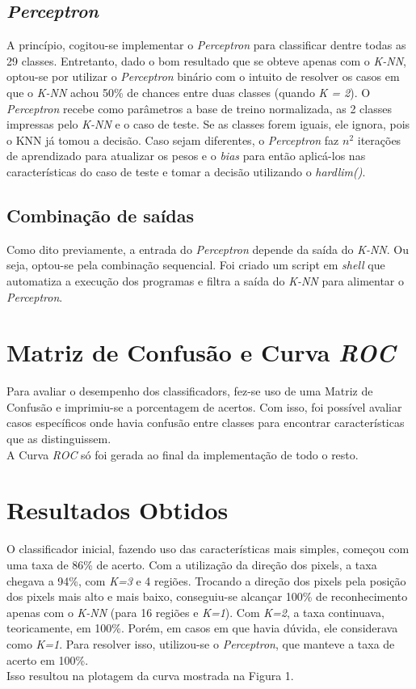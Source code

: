 \documentclass[a4paper,12pt]{article}
\begin{document}
\subsection{\textit{Perceptron}}
A princípio, cogitou-se implementar o \textit{Perceptron} para classificar dentre todas 
as 29 classes. Entretanto, dado o bom resultado que se obteve apenas com o \textit{K-NN},
 optou-se por utilizar o \textit{Perceptron} binário com o intuito de resolver os casos em 
que o \textit{K-NN} achou 50\% de chances entre duas classes (quando \textit{K = 2}). O
 \textit{Perceptron} recebe como parâmetros a base de treino normalizada, as 2 classes 
impressas pelo \textit{K-NN} e o caso de teste. Se as classes forem iguais, ele ignora, 
pois o KNN já tomou a decisão. Caso sejam diferentes, o \textit{Perceptron} faz
 \begin{math}n^2\end{math}
 iterações de aprendizado para atualizar os pesos e o \textit{bias} para então
aplicá-los nas características do caso de teste e tomar a decisão utilizando o 
\textit{hardlim()}. 

\subsection{Combinação de saídas}
Como dito previamente, a entrada do \textit{Perceptron} depende da saída do \textit{K-NN}. Ou 
seja, optou-se pela combinação sequencial. Foi criado um script em \textit{shell} que
 automatiza a execução dos programas e filtra a saída do \textit{K-NN} para alimentar o
 \textit{Perceptron}.

\section{Matriz de Confusão e Curva \textit{ROC}}
Para avaliar o desempenho dos classificadors, fez-se uso de uma Matriz de
 Confusão e imprimiu-se a porcentagem de acertos. Com isso, foi possível avaliar
 casos específicos onde havia confusão entre classes para encontrar
 características que as distinguissem.\\
A Curva \textit{ROC} só foi gerada ao final da implementação de todo o resto.

\section{Resultados Obtidos}
O classificador inicial, fazendo uso das características mais simples, 
começou com uma taxa de 86\% de acerto. Com a utilização da direção dos pixels, 
a taxa chegava a 94\%, com \textit{K=3} e 4 regiões. Trocando a direção dos pixels pela 
posição dos pixels mais alto e mais baixo, conseguiu-se alcançar 100\% de 
reconhecimento apenas com o \textit{K-NN} (para 16 regiões e \textit{K=1}). Com \textit{K=2}, a taxa 
continuava, teoricamente, em 100\%. Porém, em casos em que havia dúvida, ele 
considerava como \textit{K=1}. Para resolver isso, utilizou-se o \textit{Perceptron}, que manteve 
a taxa de acerto em 100\%.\\
Isso resultou na plotagem da curva mostrada na Figura 1.
\end{document}
